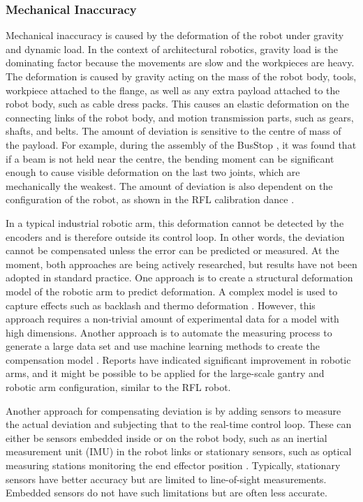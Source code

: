 \subsubsection{Mechanical Inaccuracy}
\label{subsubsection:new-hypo-mechanical-inaccuracy}

Mechanical inaccuracy is caused by the deformation of the robot under gravity and dynamic load. In the context of architectural robotics, gravity load is the dominating factor because the movements are slow and the workpieces are heavy. The deformation is caused by gravity acting on the mass of the robot body, tools, workpiece attached to the flange, as well as any extra payload attached to the robot body, such as cable dress packs. This causes an elastic deformation on the connecting links of the robot body, and motion transmission parts, such as gears, shafts, and belts. The amount of deviation is sensitive to the centre of mass of the payload. For example, during the assembly of the BusStop , it was found that if a beam is not held near the centre, the bending moment can be significant enough to cause visible deformation on the last two joints, which are mechanically the weakest. The amount of deviation is also dependent on the configuration of the robot, as shown in the RFL calibration dance .

In a typical industrial robotic arm, this deformation cannot be detected by the encoders and is therefore outside its control loop. In other words, the deviation cannot be compensated unless the error can be predicted or measured. At the moment, both approaches are being actively researched, but results have not been adopted in standard practice. One approach is to create a structural deformation model of the robotic arm to predict deformation. A complex model is used to capture effects such as backlash and thermo deformation \parencite{wuReviewIndustrialRobot2022}. However, this approach requires a non-trivial amount of experimental data for a model with high dimensions. Another approach is to automate the measuring process to generate a large data set and use machine learning methods to create the compensation model \parencite{yeHighaccuracyPredictionCompensation2022}. Reports have indicated significant improvement in robotic arms, and it might be possible to be applied for the large-scale gantry and robotic arm configuration, similar to the RFL robot.

Another approach for compensating deviation is by adding sensors to measure the actual deviation and subjecting that to the real-time control loop. These can either be sensors embedded inside or on the robot body, such as an inertial measurement unit (IMU) in the robot links \parencite{judHEAPAutonomousWalking2021} or stationary sensors, such as optical measuring stations monitoring the end effector position \parencite{stadelmannEndEffectorPoseCorrection2019}. Typically, stationary sensors have better accuracy but are limited to line-of-sight measurements. Embedded sensors do not have such limitations but are often less accurate. 

